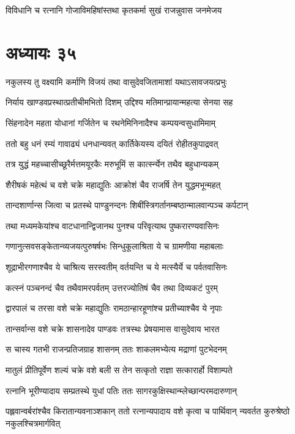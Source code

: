 \twolineshloka
{विविधानि च रत्नानि गोजाविमहिषांस्तथा}
{कृतकर्मा सुखं राजन्नुवास जनमेजय}


\chapter{अध्यायः ३५}
\twolineshloka
{नकुलस्य तु वक्ष्यामि कर्माणि विजयं तथा}
{वासुदेवजितामाशां यथाऽसावजयत्प्रभुः}


\twolineshloka
{निर्याय खाण्डवप्रस्थात्प्रतीचीमभितो दिशम्}
{उद्दिश्य मतिमान्प्रायान्महत्या सेनया सह}


\twolineshloka
{सिंहनादेन महता योधानां गर्जितेन च}
{रथनेमिनिनादैश्च कम्पयन्वसुधामिमाम्}


\twolineshloka
{ततो बहु धनं रम्यं गावाढ्यं धनधान्यवत्}
{कार्तिकेयस्य दयितं रोहीतकुपाद्रवत्}


\twolineshloka
{तत्र युद्धं महच्चासीच्छूरैर्मत्तमयूरकैः}
{मरुभूमिं स कार्त्स्न्येन तथैव बहुधान्यकम्}


\twolineshloka
{शैरीषकं महेत्थं च वशे चक्रे महाद्युतिः}
{आक्रोशं चैव राजर्षि तेन युद्धमभून्महत्}


\twolineshloka
{तान्दशार्णान्स जित्वा च प्रतस्थे पाण्डुनन्दनः}
{शिबींस्त्रिगर्तानम्बष्ठान्मालवान्पञ्च कर्पटान्}


\twolineshloka
{तथा मध्यमकेयांश्च वाटधानान्द्विजानथ}
{पुनश्च परिवृत्याथ पुष्करारण्यवासिनः}


\twolineshloka
{गणानुत्सवसङ्केतान्व्यजयत्पुरुषर्षभः}
{सिन्धुकूलाश्रिता ये च ग्रामणीया महाबलाः}


\twolineshloka
{शूद्राभीरगणाश्चैव ये चाश्रित्य सरस्वतीम्}
{वर्तयन्ति च ये मत्स्यैर्ये च पर्वतवासिनः}


\twolineshloka
{कत्स्नं पञ्चनन्दं चैव तथैवामरपर्वतम्}
{उत्तरज्योतिषं चैव तथा दिव्यकटं पुरम्}


\twolineshloka
{द्वारपालं च तरसा वशे चक्रे महाद्युतिः}
{रामठान्हारहूणांश्च प्रतीच्याश्चैव ये नृपाः}


\twolineshloka
{तान्सर्वान्स वशे चक्रे शासनादेव पाण्डवः}
{तत्रस्थः प्रेषयामास वासुदेवाय भारत}


\twolineshloka
{स चास्य गतभी राजन्प्रतिजग्राह शासनम्}
{ततः शाकलमभ्येत्य मद्राणां पुटभेदनम्}


\twolineshloka
{मातुलं प्रीतिपूर्वेण शल्यं चक्रे वशे बली}
{स तेन सत्कृतो राज्ञा सत्कारार्हो विशाम्पते}


\twolineshloka
{रत्नानि भूरीण्यादाय सम्प्रतस्थे युधां पतिः}
{ततः सागरकुक्षिस्थान्म्लेच्छान्परमदारुणान्}


\threelineshloka
{पह्लवान्वर्बरांश्चैव किरातान्यवनाञ्शकान्}
{ततो रत्नान्यपादाय वशे कृत्वा च पार्थिवान्}
{न्यवर्तत कुरुश्रेष्ठो नकुलश्चित्रमार्गवित्}


